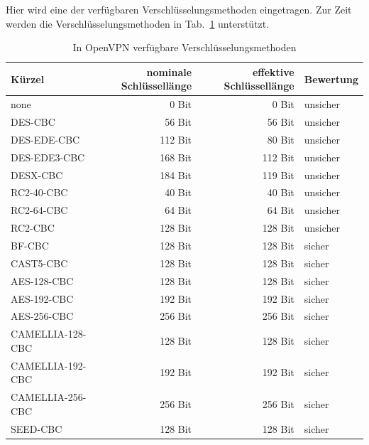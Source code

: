 \begin{description}


  Hier wird eine der verfügbaren Verschlüsselungsmethoden eingetragen. Zur Zeit
  werden die Verschlüsselungsmethoden in Tab.~\ref{openvpn:ciphers} unterstützt.

  \begin{table}[!ht]
    \centering
    \caption{In OpenVPN verfügbare Verschlüsselungsmethoden}
    \label{openvpn:ciphers}
    \begin{tabular}{|p{4cm}|r|r|l|}
      \hline
      Kürzel           & nominale Schlüssellänge & effektive Schlüssellänge & Bewertung \\
      \hline
      none             &   0 Bit &   0 Bit & unsicher \\
      DES-CBC          &  56 Bit &  56 Bit & unsicher \\
      DES-EDE-CBC      & 112 Bit &  80 Bit & unsicher \\
      DES-EDE3-CBC     & 168 Bit & 112 Bit & unsicher \\
      DESX-CBC         & 184 Bit & 119 Bit & unsicher \\
      RC2-40-CBC       &  40 Bit &  40 Bit & unsicher \\
      RC2-64-CBC       &  64 Bit &  64 Bit & unsicher \\
      RC2-CBC          & 128 Bit & 128 Bit & unsicher \\
      BF-CBC           & 128 Bit & 128 Bit & sicher \\
      CAST5-CBC        & 128 Bit & 128 Bit & sicher \\
      AES-128-CBC      & 128 Bit & 128 Bit & sicher \\
      AES-192-CBC      & 192 Bit & 192 Bit & sicher \\
      AES-256-CBC      & 256 Bit & 256 Bit & sicher \\
      CAMELLIA-128-CBC & 128 Bit & 128 Bit & sicher \\
      CAMELLIA-192-CBC & 192 Bit & 192 Bit & sicher \\
      CAMELLIA-256-CBC & 256 Bit & 256 Bit & sicher \\
      SEED-CBC         & 128 Bit & 128 Bit & sicher \\
      \hline
    \end{tabular}
  \end{table}


\end{description}
